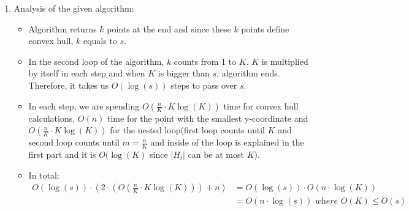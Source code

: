 \begin{enumerate}
  \item Analysis of the given algorithm:
    \begin{itemize}
      \item Algorithm returns $k$ points at the end and since these $k$ points define convex hull, $k$ equals to $s$.
      \item In the second loop of the algorithm, $k$ counts from 1 to $K$. $K$ is multiplied by itself in each step and when $K$ is bigger than $s$, algorithm ends. Therefore, it takes us $O(\log(s))$ steps to pass over $s$.
      \item In each step, we are spending $O(\frac{n}{K} \cdot K \log(K))$ time for convex hull calculations, $O(n)$ time for the point with the smallest y-coordinate and $O(\frac{n}{K} \cdot K \log(K))$ for the nested loop(first loop counts until $K$ and second loop counts until $m=\frac{n}{K}$ and inside of the loop is explained in the first part and it is $O(\log(K)$ since $|H_i|$ can be at most $K$).
      \item In total:
        \begin{align*}
          O(\log(s)) \cdot (2 \cdot(O(\frac{n}{K} \cdot K \log(K))) + n) &= O(\log(s)) \cdot O(n \cdot \log(K)) \\
          &= O(n \cdot \log(s)) \textit{ where } O(K) \leq O(s)
        \end{align*}               
    \end{itemize}
  

\end{enumerate}

